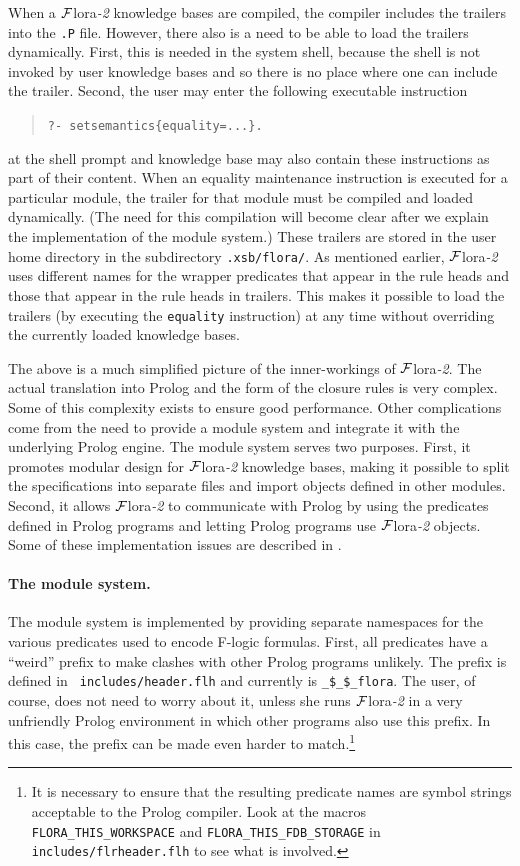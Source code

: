 \documentclass[11pt]{article}
\newcommand{\FLORA}{{\mbox{\sc ${\cal F}${lora}\rm\emph{-2}}}\xspace}
\newcommand{\FLSYSTEM}{\FLORA}
\newcommand{\fl}{\mbox{F-logic}\xspace}
\begin{document}
{When a \FLSYSTEM knowledge bases are compiled, the compiler includes the trailers into
the {\tt .P} file. However, there also is a need to be able to load the
trailers dynamically. First, this is needed in the system shell, because
the shell is not invoked by user knowledge bases and so there is
no place where one can include the trailer. Second, the user may enter the
following executable instruction 
\begin{quote}
   {\tt ?- setsemantics\{equality=...\}. }
\end{quote}
at the shell prompt and knowledge base may also contain these instructions as
part of their content.  When an equality maintenance instruction is executed
for a particular module, the trailer for that module must be compiled and
loaded dynamically.  (The need for this compilation will become clear after
we explain the implementation of the module system.)  These trailers are
stored in the user home directory in the subdirectory {\tt .xsb/flora/}.
As mentioned earlier, \FLSYSTEM uses different names for the wrapper predicates
that appear in the rule heads and those that appear in the
rule heads in trailers. This makes it possible to load the trailers (by
executing the {\tt equality} instruction) at any time without overriding
the currently loaded knowledge bases.

The above is a much simplified picture of the inner-workings of \FLSYSTEM. The
actual translation into Prolog and the form of the closure rules is very
complex.  Some of this complexity exists to ensure good performance.  Other
complications come from the need to provide a module system and integrate
it with the underlying Prolog engine.  The module system serves two
purposes.  First, it promotes modular design for \FLSYSTEM knowledge bases, making it
possible to split the specifications into separate files and import objects defined
in other modules. Second, it allows \FLSYSTEM to communicate with
Prolog by using the predicates defined in Prolog programs and letting
Prolog programs use \FLSYSTEM objects.  Some of these implementation issues
are described in \cite{guiz-flora-00}.

\paragraph{The module system.} The module system is implemented by
providing separate namespaces for the various predicates used to encode \fl
formulas. First, all predicates have a ``weird'' prefix to make clashes with
other Prolog programs unlikely. The prefix is defined in {\tt
  includes/header.flh} and currently is {\tt \_\$\_\$\_flora}. The user, of
course, does not need to worry about it, unless she runs \FLSYSTEM in
a very unfriendly Prolog environment in which other programs also use this
prefix. In this case, the prefix can be made
even harder to match.\footnote{
  It is necessary to ensure that the resulting predicate names are symbol
  strings acceptable to the Prolog compiler. Look at the macros
  {\tt FLORA\_THIS\_WORKSPACE} and {\tt FLORA\_THIS\_FDB\_STORAGE} in
  {\tt includes/flrheader.flh} to see what is involved.
  }

}
\end{document}
